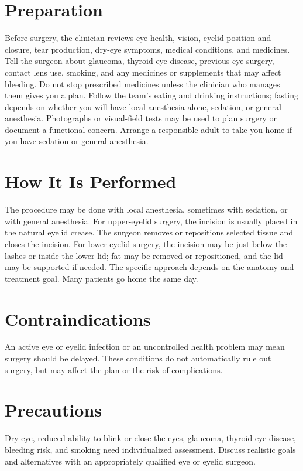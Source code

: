 \section*{Preparation}
Before surgery, the clinician reviews eye health, vision, eyelid position and closure, tear production, dry-eye symptoms, medical conditions, and medicines. Tell the surgeon about glaucoma, thyroid eye disease, previous eye surgery, contact lens use, smoking, and any medicines or supplements that may affect bleeding. Do not stop prescribed medicines unless the clinician who manages them gives you a plan. Follow the team's eating and drinking instructions; fasting depends on whether you will have local anesthesia alone, sedation, or general anesthesia. Photographs or visual-field tests may be used to plan surgery or document a functional concern. Arrange a responsible adult to take you home if you have sedation or general anesthesia.

\section*{How It Is Performed}
The procedure may be done with local anesthesia, sometimes with sedation, or with general anesthesia. For upper-eyelid surgery, the incision is usually placed in the natural eyelid crease. The surgeon removes or repositions selected tissue and closes the incision. For lower-eyelid surgery, the incision may be just below the lashes or inside the lower lid; fat may be removed or repositioned, and the lid may be supported if needed. The specific approach depends on the anatomy and treatment goal. Many patients go home the same day.

\section*{Contraindications}
An active eye or eyelid infection or an uncontrolled health problem may mean surgery should be delayed. These conditions do not automatically rule out surgery, but may affect the plan or the risk of complications.

\section*{Precautions}
Dry eye, reduced ability to blink or close the eyes, glaucoma, thyroid eye disease, bleeding risk, and smoking need individualized assessment. Discuss realistic goals and alternatives with an appropriately qualified eye or eyelid surgeon.

